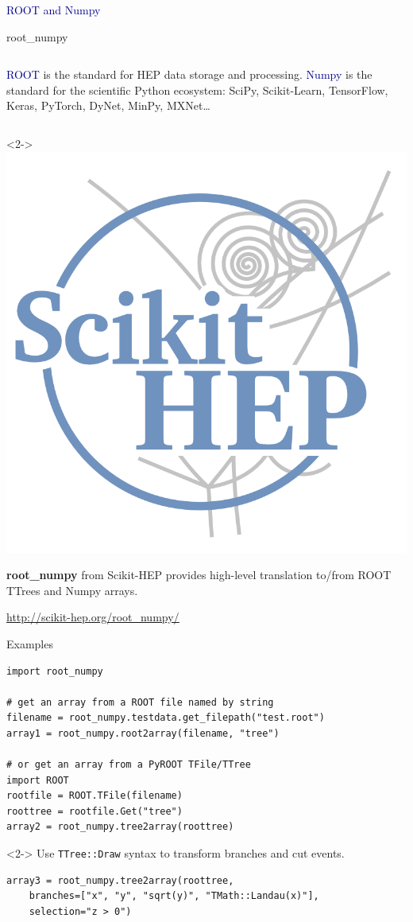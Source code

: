 \documentclass{beamer}
\begin{document}
\begin{frame}{}
\begin{center}
\LARGE \textcolor{darkblue}{ROOT and Numpy}
\end{center}
\end{frame}

\begin{frame}[frame]{root\_numpy}
\vfill
\begin{columns}[t]
\textcolor{darkblue}{ROOT} is the standard for HEP data storage and processing.
\textcolor{darkblue}{Numpy} is the standard for the scientific Python ecosystem: {\small SciPy,} {\small Scikit-Learn,} {\footnotesize TensorFlow,} {\footnotesize Keras,} {\scriptsize PyTorch,} {\scriptsize DyNet,} {\tiny MinPy,} {\tiny MXNet\ldots}
\end{columns}

\vfill
\begin{uncoverenv}<2->
\includegraphics[height=2.5 cm]{scikit-hep_logo_800.png}

\vspace{-2.5 cm}
\hfill \begin{minipage}{0.7\linewidth}
{\bf root\_numpy} from Scikit-HEP provides high-level translation to/from ROOT TTrees and Numpy arrays.

\vspace{0.5 cm}
\textcolor{blue}{\underline{\url{http://scikit-hep.org/root_numpy/}}}
\end{minipage}
\end{uncoverenv}
\end{frame}

\begin{frame}[fragile]{Examples}
\footnotesize
\begin{verbatim}
import root_numpy

# get an array from a ROOT file named by string
filename = root_numpy.testdata.get_filepath("test.root")
array1 = root_numpy.root2array(filename, "tree")

# or get an array from a PyROOT TFile/TTree
import ROOT
rootfile = ROOT.TFile(filename)
roottree = rootfile.Get("tree")
array2 = root_numpy.tree2array(roottree)
\end{verbatim}

\vspace{0.5 cm}
\begin{uncoverenv}<2->
{\normalsize Use {\tt TTree::Draw} syntax to transform branches and cut events.}

\begin{verbatim}
array3 = root_numpy.tree2array(roottree,
    branches=["x", "y", "sqrt(y)", "TMath::Landau(x)"],
    selection="z > 0")
\end{verbatim}
\end{uncoverenv}
\end{frame}
\end{document}
